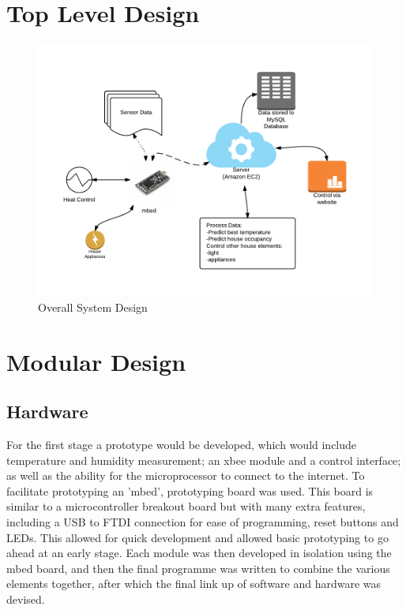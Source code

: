 \documentclass[10.5pt,a4paper,twoside]{report}   %
\begin{document}
\chapter{Top Level Design} 

\begin{figure}[h!]
  \vspace{-50pt}
  
  \centering
    \includegraphics[width=1\textwidth]{images/sysdiag.pdf}
    \caption{Overall System Design}
  \vspace{-10pt}
\end{figure}


\chapter{Modular Design} 
\section{Hardware}     %
For the first stage a prototype would be developed, which would include temperature and humidity measurement; an xbee module and a control interface; as well as the ability for the microprocessor to connect to the internet. To facilitate prototyping an 'mbed', prototyping board was used. This board is similar to a microcontroller breakout board but with many extra features, including a USB to FTDI connection for ease of programming, reset buttons and LEDs. This allowed for quick development and allowed basic prototyping to go ahead at an early stage.  Each module was then developed in isolation using the mbed board, and then the final programme was written to combine the various elements together, after which the final link up of software and hardware was devised.
\end{document}
